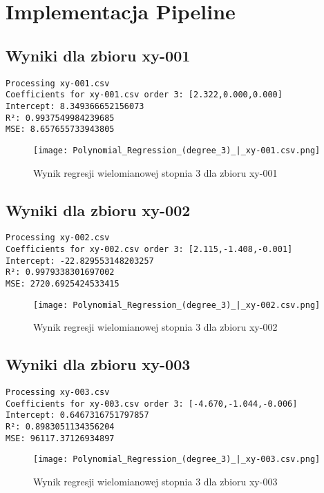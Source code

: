 \documentclass{article}
\begin{document}
\section{Implementacja Pipeline}
\subsection{Wyniki dla zbioru xy-001}
\begin{verbatim}
Processing xy-001.csv
Coefficients for xy-001.csv order 3: [2.322,0.000,0.000]
Intercept: 8.349366652156073
R²: 0.9937549984239685
MSE: 8.657655733943805
\end{verbatim}

\begin{figure}[H]
    \centering
    \texttt{[image: Polynomial\_Regression\_(degree\_3)\_|\_xy-001.csv.png]}
    \caption{Wynik regresji wielomianowej stopnia 3 dla zbioru xy-001}
\end{figure}

\subsection{Wyniki dla zbioru xy-002}
\begin{verbatim}
Processing xy-002.csv
Coefficients for xy-002.csv order 3: [2.115,-1.408,-0.001]
Intercept: -22.829553148203257
R²: 0.9979338301697002
MSE: 2720.6925424533415
\end{verbatim}

\begin{figure}[H]
    \centering
    \texttt{[image: Polynomial\_Regression\_(degree\_3)\_|\_xy-002.csv.png]}
    \caption{Wynik regresji wielomianowej stopnia 3 dla zbioru xy-002}
\end{figure}

\subsection{Wyniki dla zbioru xy-003}
\begin{verbatim}
Processing xy-003.csv
Coefficients for xy-003.csv order 3: [-4.670,-1.044,-0.006]
Intercept: 0.6467316751797857
R²: 0.8983051134356204
MSE: 96117.37126934897
\end{verbatim}

\begin{figure}[H]
    \centering
    \texttt{[image: Polynomial\_Regression\_(degree\_3)\_|\_xy-003.csv.png]}
    \caption{Wynik regresji wielomianowej stopnia 3 dla zbioru xy-003}
\end{figure}
\end{document}
